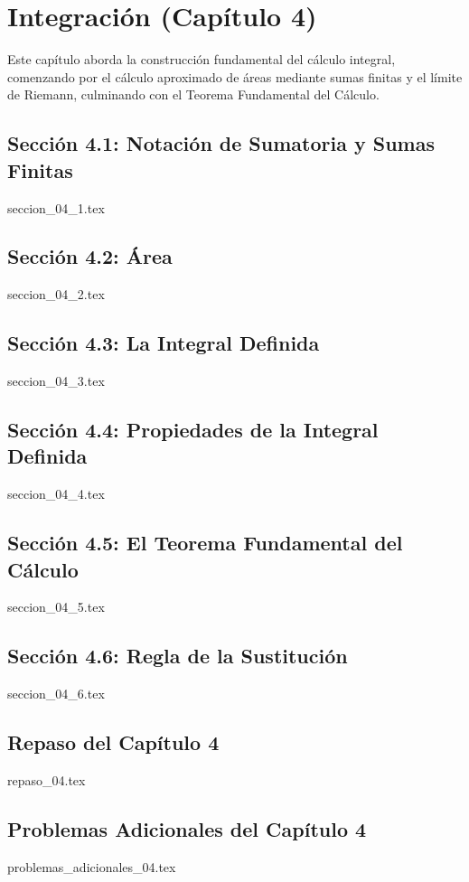 \chapter{Integración (Capítulo 4)}
\label{cap:integracion}

Este capítulo aborda la construcción fundamental del cálculo integral, comenzando por el cálculo aproximado de áreas mediante sumas finitas y el límite de Riemann, culminando con el Teorema Fundamental del Cálculo.

\section{Sección 4.1: Notación de Sumatoria y Sumas Finitas}
{seccion_04_1.tex}

\section{Sección 4.2: Área}
{seccion_04_2.tex}

\section{Sección 4.3: La Integral Definida}
{seccion_04_3.tex}

\section{Sección 4.4: Propiedades de la Integral Definida}
{seccion_04_4.tex}

\section{Sección 4.5: El Teorema Fundamental del Cálculo}
{seccion_04_5.tex}

\section{Sección 4.6: Regla de la Sustitución}
{seccion_04_6.tex}

\section{Repaso del Capítulo 4}
{repaso_04.tex}

\section{Problemas Adicionales del Capítulo 4}
{problemas_adicionales_04.tex}
